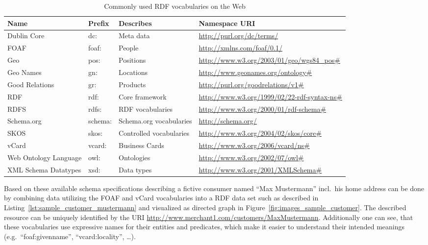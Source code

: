 \begin{table}[H]
\centering
\begin{tabular}{p{3cm}llp{4.5cm}}
\hline
\textbf{Name} & \textbf{Prefix} & \textbf{Describes} & \textbf{Namespace URI} \\
\hline
Dublin Core & dc: & Meta data & \url{http://purl.org/dc/terms/} \\
\hline
FOAF & foaf: & People & \url{http://xmlns.com/foaf/0.1/} \\
\hline
Geo & pos: & Positions & \url{http://www.w3.org/2003/01/geo/wgs84\_pos\#} \\
\hline
Geo Names & gn: & Locations & \url{http://www.geonames.org/ontology\#} \\
\hline
Good Relations & gr: & Products & \url{http://purl.org/goodrelations/v1\#} \\
\hline
RDF & rdf: & Core framework & \url{http://www.w3.org/1999/02/22-rdf-syntax-ns\#} \\
\hline
RDFS & rdfs: & RDF vocabularies & \url{http://www.w3.org/2000/01/rdf-schema\#} \\
\hline
Schema.org & schema: & Schema.org vocabularies & \url{http://schema.org/} \\
\hline
SKOS & skos: & Controlled vocabularies & \url{http://www.w3.org/2004/02/skos/core\#} \\
\hline
vCard & vcard: & Business Cards & \url{http://www.w3.org/2006/vcard/ns\#} \\
\hline
Web Ontology Language & owl: & Ontologies & \url{http://www.w3.org/2002/07/owl\#} \\
\hline
XML Schema Datatypes & xsd: & Data types & \url{http://www.w3.org/2001/XMLSchema\#} \\
\hline
\end{tabular}
\caption[Commonly used \gls{RDF} vocabularies on the Web]{Commonly used \gls{RDF} vocabularies on the Web \citep[pg. 41]{wood2014linked}}
\label{tab:used_vocab_rdf}
\end{table}

Based on these available schema specifications describing a fictive consumer named ``Max Mustermann'' incl.\ his home address can be done by combining data utilizing the \gls{FOAF} and \gls{vCard} vocabularies into a \gls{RDF} data set such as described in Listing~\ref{lst:sample_customer_mustermann} and visualized as directed graph in Figure~\ref{fig:images_sample_customer}. The described resource can be uniquely identified by the \gls{URI} \url{http://www.merchant1.com/customers/MaxMustermann}. Additionally one can see, that these vocabularies use expressive names for their entities and predicates, which make it easier to understand their intended meanings (e.g.\ ``foaf:givenname'', ``vcard:locality'', \ldots).  \@

